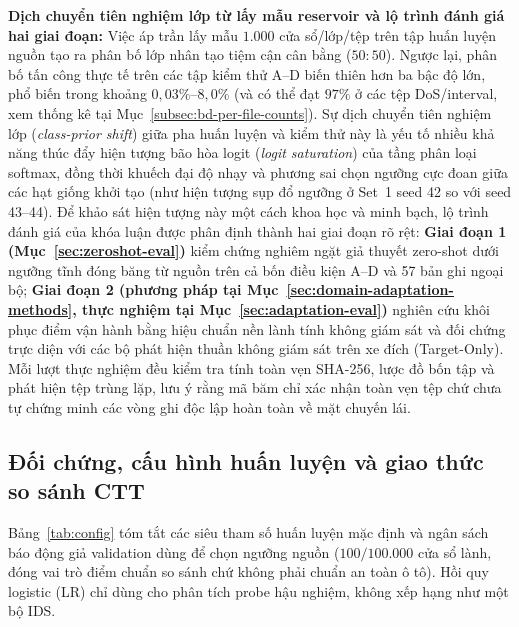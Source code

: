 \documentclass[12pt, a4paper, reqno, oneside]{book}
\begin{document}
\noindent\textbf{Dịch chuyển tiên nghiệm lớp từ lấy mẫu reservoir và lộ trình đánh giá hai giai đoạn:} Việc áp trần lấy mẫu $1.000$ cửa sổ/lớp/tệp trên tập huấn luyện nguồn tạo ra phân bố lớp nhân tạo tiệm cận cân bằng ($50:50$). Ngược lại, phân bố tấn công thực tế trên các tập kiểm thử A--D biến thiên hơn ba bậc độ lớn, phổ biến trong khoảng $0{,}03\%\text{--}8{,}0\%$ (và có thể đạt $97\%$ ở các tệp DoS/interval, xem thống kê tại Mục~\ref{subsec:bd-per-file-counts}). Sự dịch chuyển tiên nghiệm lớp (\textit{class-prior shift}) giữa pha huấn luyện và kiểm thử này là yếu tố nhiều khả năng thúc đẩy hiện tượng bão hòa logit (\textit{logit saturation}) của tầng phân loại softmax, đồng thời khuếch đại độ nhạy và phương sai chọn ngưỡng cực đoan giữa các hạt giống khởi tạo (như hiện tượng sụp đổ ngưỡng ở Set~1 seed 42 so với seed 43--44). Để khảo sát hiện tượng này một cách khoa học và minh bạch, lộ trình đánh giá của khóa luận được phân định thành hai giai đoạn rõ rệt: \textbf{Giai đoạn 1 (Mục~\ref{sec:zeroshot-eval})} kiểm chứng nghiêm ngặt giả thuyết zero-shot dưới ngưỡng tĩnh đóng băng từ nguồn trên cả bốn điều kiện A--D và 57 bản ghi ngoại bộ; \textbf{Giai đoạn 2 (phương pháp tại Mục~\ref{sec:domain-adaptation-methods}, thực nghiệm tại Mục~\ref{sec:adaptation-eval})} nghiên cứu khôi phục điểm vận hành bằng hiệu chuẩn nền lành tính không giám sát và đối chứng trực diện với các bộ phát hiện thuần không giám sát trên xe đích (Target-Only). Mỗi lượt thực nghiệm đều kiểm tra tính toàn vẹn SHA-256, lược đồ bốn tập và phát hiện tệp trùng lặp, lưu ý rằng mã băm chỉ xác nhận toàn vẹn tệp chứ chưa tự chứng minh các vòng ghi độc lập hoàn toàn về mặt chuyến lái.

\subsection{Đối chứng, cấu hình huấn luyện và giao thức so sánh CTT}\label{sec:comparison-protocol}
Bảng~\ref{tab:config} tóm tắt các siêu tham số huấn luyện mặc định và ngân sách báo động giả validation dùng để chọn ngưỡng nguồn ($100/100.000$ cửa sổ lành, đóng vai trò điểm chuẩn so sánh chứ không phải chuẩn an toàn ô tô). Hồi quy logistic (LR) chỉ dùng cho phân tích probe hậu nghiệm, không xếp hạng như một bộ IDS.
\end{document}
